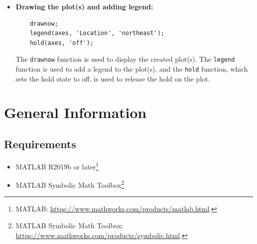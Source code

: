 \documentclass[13pt,a4paper]{report}
\begin{document}
\begin{itemize}[leftmargin=0.1cm]
\begin{verbatim}
    |\setcounter{FancyVerbLine}{65}|if PEVisibility
        plot(axes, T, PE, 'Color', 'blue', 'LineWidth', 1.5, 'DisplayName', 'PE');
    end
\end{verbatim}

The code checks if the visibility of kinetic and potential energy plots is set to true. If it is, the respective plots are created using the plot function.

\item \textbf{Drawing the plot(s) and adding legend:}

\begin{verbatim}
    drawnow;
    legend(axes, 'Location', 'northeast');
    hold(axes, 'off');
\end{verbatim}

The \texttt{drawnow} function is used to display the created plot(s). The \texttt{legend} function is used to add a legend to the plot(s), and the \texttt{hold} function, which sets the hold state to off, is used to release the hold on the plot.

\end{itemize}

\newpage
\section{General Information}
\subsection{Requirements}
\begin{itemize}[leftmargin=0.65cm,itemsep=0.15cm]
    \item MATLAB R2019b or later\footnote[1]{MATLAB: \url{https://www.mathworks.com/products/matlab.html}.}
    \item MATLAB Symbolic Math Toolbox\footnote[2]{MATLAB Symbolic Math Toolbox: \url{https://www.mathworks.com/products/symbolic.html}.}
\end{itemize}
\end{document}
